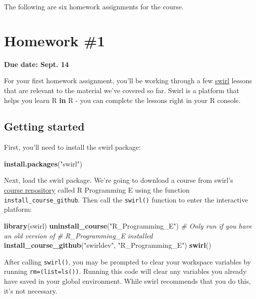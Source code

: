 \documentclass[]{book}
\makeatletter
\newenvironment{Shaded}{\begin{snugshade}}{\end{snugshade}}
\newcommand{\KeywordTok}[1]{\textcolor[rgb]{0.13,0.29,0.53}{\textbf{{#1}}}}
\newcommand{\StringTok}[1]{\textcolor[rgb]{0.31,0.60,0.02}{{#1}}}
\newcommand{\CommentTok}[1]{\textcolor[rgb]{0.56,0.35,0.01}{\textit{{#1}}}}
\newcommand{\NormalTok}[1]{{#1}}
\newenvironment{kframe}{%
\medskip{}
\setlength{\fboxsep}{.8em}
 \def\at@end@of@kframe{}%
 \ifinner\ifhmode%
  \def\at@end@of@kframe{\end{minipage}}%
  \begin{minipage}{\columnwidth}%
 \fi\fi%
 \def\FrameCommand##1{\hskip\@totalleftmargin \hskip-\fboxsep
 \colorbox{shadecolor}{##1}\hskip-\fboxsep
     \hskip-\linewidth \hskip-\@totalleftmargin \hskip\columnwidth}%
 \MakeFramed {\advance\hsize-\width
   \@totalleftmargin\z@ \linewidth\hsize
   \@setminipage}}%
 {\par\unskip\endMakeFramed%
 \at@end@of@kframe}
\renewenvironment{Shaded}{\begin{kframe}}{\end{kframe}}
\newenvironment{rmdblock}[1]
  {
  \begin{itemize}
  \renewcommand{\labelitemi}{
    \raisebox{-.7\height}[0pt][0pt]{
      {\setkeys{Gin}{width=3em,keepaspectratio}\texttt{[image: images/\#1]}}
    }
  }
  \setlength{\fboxsep}{1em}
  \begin{kframe}
  \item
  }
  {
  \end{kframe}
  \end{itemize}
  }
\newenvironment{rmdnote}
  {\begin{rmdblock}{note}}
  {\end{rmdblock}}
\makeatother
\begin{document}
The following are six homework assignments for the course.

\section{Homework \#1}\label{homework-1}

\textbf{Due date: Sept. 14}

For your first homework assignment, you'll be working through a few
\href{http://swirlstats.com/}{swirl} lessons that are relevant to the
material we've covered so far. Swirl is a platform that helps you learn
R \textbf{in} R - you can complete the lessons right in your R console.

\subsection{Getting started}\label{getting-started}

First, you'll need to install the swirl package:

\begin{Shaded}
\begin{Highlighting}[]
\KeywordTok{install.packages}\NormalTok{(}\StringTok{"swirl"}\NormalTok{)}
\end{Highlighting}
\end{Shaded}

Next, load the swirl package. We're going to download a course from
swirl's \href{https://github.com/swirldev/swirl_courses}{course
repository} called R Programming E using the function
\texttt{install\_course\_github}. Then call the \texttt{swirl()}
function to enter the interactive platform:

\begin{Shaded}
\begin{Highlighting}[]
\KeywordTok{library}\NormalTok{(swirl)}
\KeywordTok{uninstall_course}\NormalTok{(}\StringTok{"R_Programming_E"}\NormalTok{) }\CommentTok{# Only run if you have an old version of}
                                    \CommentTok{# R_Programming_E installed}
\KeywordTok{install_course_github}\NormalTok{(}\StringTok{"swirldev"}\NormalTok{, }\StringTok{"R_Programming_E"}\NormalTok{)}
\KeywordTok{swirl}\NormalTok{()}
\end{Highlighting}
\end{Shaded}

\begin{rmdnote}
After calling \texttt{swirl()}, you may be prompted to clear your
workspace variables by running \texttt{rm=(list=ls())}. Running this
code will clear any variables you already have saved in your global
environment. While swirl recommends that you do this, it's not
necessary.
\end{rmdnote}
\end{document}
